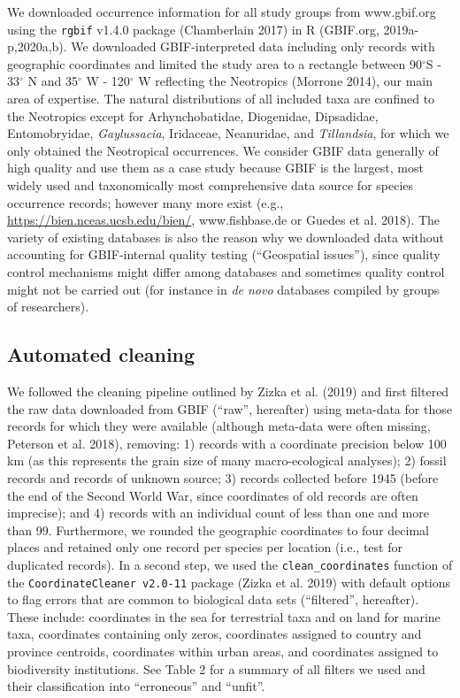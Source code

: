 \documentclass[fleqn,10pt,lineno]{wlpeerj} %
\begin{document}
We downloaded occurrence information for all study groups from www.gbif.org using the \texttt{rgbif} v1.4.0 package (Chamberlain 2017) in R (GBIF.org, 2019a-p,2020a,b). We downloaded GBIF-interpreted data including only records with geographic coordinates and limited the study area to a rectangle between 90\(^\circ\)S - 33\(^\circ\) N and 35\(^\circ\) W - 120\(^\circ\) W reflecting the Neotropics (Morrone 2014), our main area of expertise. The natural distributions of all included taxa are confined to the Neotropics except for Arhynchobatidae, Diogenidae, Dipsadidae, Entomobryidae, \emph{Gaylussacia}, Iridaceae, Neanuridae, and \emph{Tillandsia}, for which we only obtained the Neotropical occurrences. We consider GBIF data generally of high quality and use them as a case study because GBIF is the largest, most widely used and taxonomically most comprehensive data source for species occurrence records; however many more exist (e.g., \url{https://bien.nceas.ucsb.edu/bien/}, www.fishbase.de or Guedes et al. 2018). The variety of existing databases is also the reason why we downloaded data without accounting for GBIF-internal quality testing (``Geospatial issues''), since quality control mechanisms might differ among databases and sometimes quality control might not be carried out (for instance in \emph{de novo} databases compiled by groups of researchers).

\hypertarget{automated-cleaning}{%
\subsection*{Automated cleaning}\label{automated-cleaning}}

We followed the cleaning pipeline outlined by Zizka et al. (2019) and first filtered the raw data downloaded from GBIF (``raw'', hereafter) using meta-data for those records for which they were available (although meta-data were often missing, Peterson et al. 2018), removing: 1) records with a coordinate precision below 100 km (as this represents the grain size of many macro-ecological analyses); 2) fossil records and records of unknown source; 3) records collected before 1945 (before the end of the Second World War, since coordinates of old records are often imprecise); and 4) records with an individual count of less than one and more than 99. Furthermore, we rounded the geographic coordinates to four decimal places and retained only one record per species per location (i.e., test for duplicated records). In a second step, we used the \texttt{clean\_coordinates} function of the \texttt{CoordinateCleaner\ v2.0-11} package (Zizka et al. 2019) with default options to flag errors that are common to biological data sets (``filtered'', hereafter). These include: coordinates in the sea for terrestrial taxa and on land for marine taxa, coordinates containing only zeros, coordinates assigned to country and province centroids, coordinates within urban areas, and coordinates assigned to biodiversity institutions. See Table 2 for a summary of all filters we used and their classification into ``erroneous'' and ``unfit''.
\end{document}
